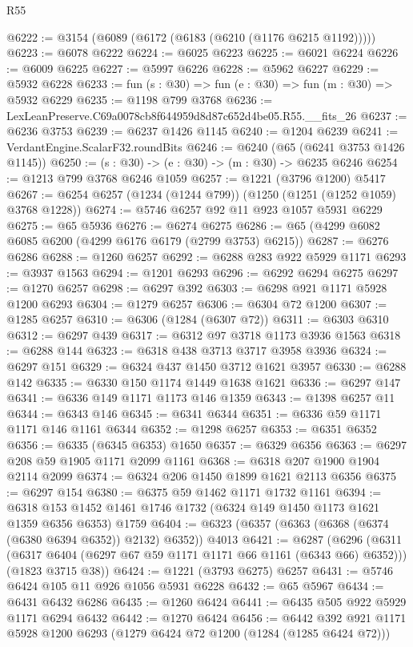 \begin{lexlean}{R55}
\begin{coremodule}
@6222 := @3154 (@6089 (@6172 (@6183 (@6210 (@1176 @6215 @1192)))))
@6223 := @6078 @6222
@6224 := @6025 @6223
@6225 := @6021 @6224
@6226 := @6009 @6225
@6227 := @5997 @6226
@6228 := @5962 @6227
@6229 := @5932 @6228
@6233 := fun (s : @30) => fun (e : @30) => fun (m : @30) => @5932 @6229
@6235 := @1198 @799 @3768
@6236 := LexLeanPreserve.C69a0078cb8f644959d8d87c652d4be05.R55.__fits_26
@6237 := @6236 @3753
@6239 := @6237 @1426 @1145
@6240 := @1204 @6239
@6241 := VerdantEngine.ScalarF32.roundBits
@6246 := @6240 (@65 (@6241 @3753 @1426 @1145))
@6250 := (s : @30) -> (e : @30) -> (m : @30) -> @6235 @6246
@6254 := @1213 @799 @3768 @6246 @1059
@6257 := @1221 (@3796 @1200) @5417
@6267 := @6254 @6257 (@1234 (@1244 @799)) (@1250 (@1251 (@1252 @1059) @3768 @1228))
@6274 := @5746 @6257 @92 @11 @923 @1057 @5931 @6229
@6275 := @65 @5936
@6276 := @6274 @6275
@6286 := @65 (@4299 @6082 @6085 @6200 (@4299 @6176 @6179 (@2799 @3753) @6215))
@6287 := @6276 @6286
@6288 := @1260 @6257
@6292 := @6288 @283 @922 @5929 @1171
@6293 := @3937 @1563
@6294 := @1201 @6293
@6296 := @6292 @6294 @6275
@6297 := @1270 @6257
@6298 := @6297 @392
@6303 := @6298 @921 @1171 @5928 @1200 @6293
@6304 := @1279 @6257
@6306 := @6304 @72 @1200
@6307 := @1285 @6257
@6310 := @6306 (@1284 (@6307 @72))
@6311 := @6303 @6310
@6312 := @6297 @439
@6317 := @6312 @97 @3718 @1173 @3936 @1563
@6318 := @6288 @144
@6323 := @6318 @438 @3713 @3717 @3958 @3936
@6324 := @6297 @151
@6329 := @6324 @437 @1450 @3712 @1621 @3957
@6330 := @6288 @142
@6335 := @6330 @150 @1174 @1449 @1638 @1621
@6336 := @6297 @147
@6341 := @6336 @149 @1171 @1173 @146 @1359
@6343 := @1398 @6257 @11
@6344 := @6343 @146
@6345 := @6341 @6344
@6351 := @6336 @59 @1171 @1171 @146 @1161 @6344
@6352 := @1298 @6257
@6353 := @6351 @6352
@6356 := @6335 (@6345 @6353) @1650
@6357 := @6329 @6356
@6363 := @6297 @208 @59 @1905 @1171 @2099 @1161
@6368 := @6318 @207 @1900 @1904 @2114 @2099
@6374 := @6324 @206 @1450 @1899 @1621 @2113 @6356
@6375 := @6297 @154
@6380 := @6375 @59 @1462 @1171 @1732 @1161
@6394 := @6318 @153 @1452 @1461 @1746 @1732 (@6324 @149 @1450 @1173 @1621 @1359 @6356 @6353) @1759
@6404 := @6323 (@6357 (@6363 (@6368 (@6374 (@6380 @6394 @6352)) @2132) @6352)) @4013
@6421 := @6287
    (@6296
      (@6311 (@6317 @6404 (@6297 @67 @59 @1171 @1171 @66 @1161 (@6343 @66) @6352)))
      (@1823 @3715 @38))
@6424 := @1221 (@3793 @6275) @6257
@6431 := @5746 @6424 @105 @11 @926 @1056 @5931 @6228
@6432 := @65 @5967
@6434 := @6431 @6432 @6286
@6435 := @1260 @6424
@6441 := @6435 @505 @922 @5929 @1171 @6294 @6432
@6442 := @1270 @6424
@6456 := @6442 @392 @921 @1171 @5928 @1200 @6293 (@1279 @6424 @72 @1200 (@1284 (@1285 @6424 @72)))

\end{coremodule}
\end{lexlean}
